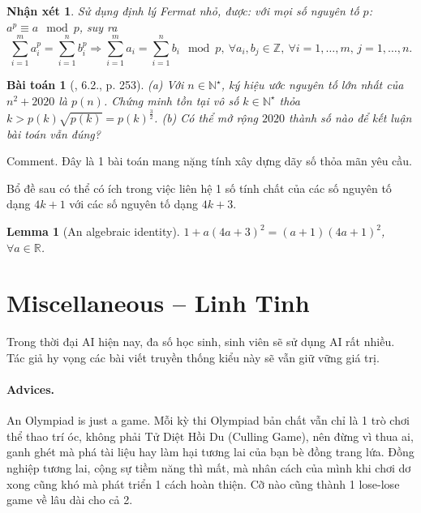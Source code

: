 \documentclass{article}
\newtheorem{baitoan}{Bài toán}
\newtheorem{lemma}{Lemma}
\newtheorem{nhanxet}{Nhận xét}
\begin{document}
\begin{nhanxet}
	Sử dụng định lý Fermat nhỏ, được: với mọi số nguyên tố $p$: $a^p\equiv a\mod p$, suy ra
	\begin{equation*}
		\sum_{i=1}^m a_i^p = \sum_{i=1}^n b_i^p\Rightarrow\sum_{i=1}^m a_i = \sum_{i=1}^n b_i\mod p,\ \forall a_i,b_j\in\mathbb{Z},\ \forall i = 1,\ldots,m,\,j = 1,\ldots,n.
	\end{equation*}
\end{nhanxet}

\begin{baitoan}[\cite{Quoc_Long_Dat_Nam_VMC}, 6.2., p. 253]
	(a) Với $n\in\mathbb{N}^\star$, ký hiệu ước nguyên tố lớn nhất của $n^2 + 2020$ là $p(n)$. Chứng minh tồn tại vô số $k\in\mathbb{N}^\star$ thỏa $k > p(k)\sqrt{p(k)} = p(k)^{\frac{3}{2}}$. (b) Có thể mở rộng $2020$ thành số nào để kết luận bài toán vẫn đúng?
\end{baitoan}
{\sf Comment.} Đây là 1 bài toán mang nặng tính xây dựng dãy số thỏa mãn yêu cầu.

Bổ đề sau có thể có ích trong việc liên hệ 1 số tính chất của các số nguyên tố dạng $4k + 1$ với các số nguyên tố dạng $4k + 3$.

\begin{lemma}[An algebraic identity]
	$1 + a(4a + 3)^2 = (a + 1)(4a + 1)^2$, $\forall a\in\mathbb{R}$.
\end{lemma}


\section{Miscellaneous -- Linh Tinh}
Trong thời đại AI hiện nay, đa số học sinh, sinh viên sẽ sử dụng AI rất nhiều. Tác giả hy vọng các bài viết truyền thống kiểu này sẽ vẫn giữ vững giá trị.

\paragraph{Advices.} An Olympiad is just a game. Mỗi kỳ thi Olympiad bản chất vẫn chỉ là 1 trò chơi thể thao trí óc, không phải Tử Diệt Hồi Du (Culling Game), nên đừng vì thua ai, ganh ghét mà phá tài liệu hay làm hại tương lai của bạn bè đồng trang lứa. Đồng nghiệp tương lai, cộng sự tiềm năng thì mất, mà nhân cách của mình khi chơi dơ xong cũng khó mà phát triển 1 cách hoàn thiện. Cỡ nào cũng thành 1 lose-lose game về lâu dài cho cả 2.
\end{document}

